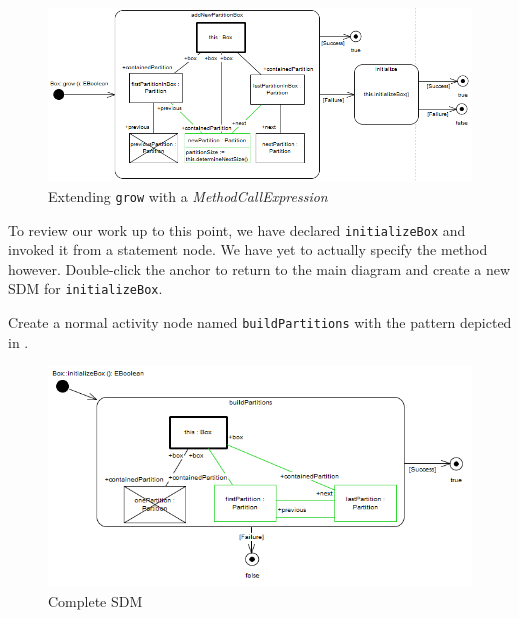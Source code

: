 \begin{stepbystep}
\vspace{0.5cm}

\begin{figure}[htp]
\begin{center}
  \includegraphics[width=\textwidth]{../../org.moflon.doc.handbook.03_storyDiagrams/09_conditionalBranching/visCBImages/ea_growAdditions}
  \caption{Extending \texttt{grow} with a \emph{MethodCallExpression}}
  \label{ea:newGrowControl}
\end{center}
\end{figure}

\item To review our work up to this point, we have declared \texttt{initializeBox} and invoked it from a statement node. We have yet
to actually specify the method however. Double-click the anchor to return to the main diagram and create a new SDM
for \texttt{initializeBox}.

\item Create a normal activity node named \texttt{buildPartitions} with the pattern depicted in .

\newpage
 
\begin{figure}[htp]
\begin{center}
  \includegraphics[width=\textwidth]{../../org.moflon.doc.handbook.03_storyDiagrams/09_conditionalBranching/visCBImages/eclipse_buildPartitions}
  \caption{Complete SDM}
  \label{ea:buildPartitions}
\end{center}
\end{figure}
 

\end{stepbystep}
